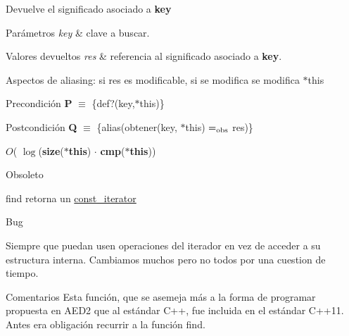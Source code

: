 Devuelve el significado asociado a {\bfseries key} 


\begin{DoxyParams}{Parámetros}
{\em key} & clave a buscar. \\
\hline
\end{DoxyParams}

\begin{DoxyRetVals}{Valores devueltos}
{\em res} & referencia al significado asociado a {\bfseries key}.\\
\hline
\end{DoxyRetVals}
\begin{DoxyParagraph}{Aspectos de aliasing\+:}
si res es modificable, si se modifica se modifica $\ast$this
\end{DoxyParagraph}
\begin{DoxyPrecond}{Precondición}
{\bfseries P} $\equiv$ \{def?(key,$\ast$this)\}
\end{DoxyPrecond}
\begin{DoxyPostcond}{Postcondición}
{\bfseries Q} $\equiv$ \{alias(obtener(key, $\ast$this) $=_{\rm obs}$ res)\}
\end{DoxyPostcond}

\begin{DoxyDescription}
\item[Complejidad Temporal]$O$( $\log$({\bfseries size}({\bfseries $\ast$this}) $\cdot$ {\bfseries cmp}({\bfseries $\ast$this}))
\end{DoxyDescription}

\begin{DoxyRefDesc}{Obsoleto}
\item[\hyperlink{deprecated__deprecated000006}{Obsoleto}]find retorna un \hyperlink{classaed2_1_1map_1_1const__iterator}{const\+\_\+iterator} \end{DoxyRefDesc}
\begin{DoxyRefDesc}{Bug}
\item[\hyperlink{bug__bug000001}{Bug}]Siempre que puedan usen operaciones del iterador en vez de acceder a su estructura interna. Cambiamos muchos pero no todos por una cuestion de tiempo.\end{DoxyRefDesc}


\begin{DoxyRemark}{Comentarios}
Esta función, que se asemeja más a la forma de programar propuesta en A\+E\+D2 que al estándar C++, fue incluida en el estándar C++11. Antes era obligación recurrir a la función find. 
\end{DoxyRemark}


